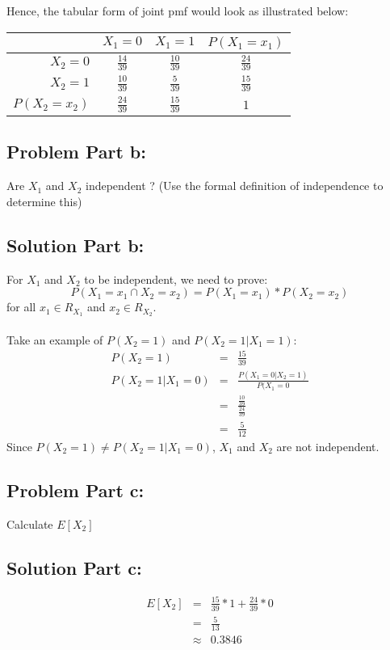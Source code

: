\documentclass[12pt]{article}%
\begin{document}
Hence, the tabular form of joint pmf would look as illustrated below: \\
\renewcommand{\arraystretch}{2}
\begin{center}
\begin{tabular}[5pt]{| r | c | c | c |}
\hline
 & $X_1 = 0$ & $X_1 = 1$ & $P(X_1 = x_1)$ \\
\hline
$X_2 = 0$ & $\frac{14}{39}$ & $\frac{10}{39}$ & $\frac{24}{39}$\\
\hline 
$X_2 = 1$ & $\frac{10}{39}$ & $\frac{5}{39}$ & $\frac{15}{39}$\\
\hline
$P(X_2 = x_2)$ & $\frac{24}{39}$ & $\frac{15}{39}$ & $1$ \\
\hline 
\end{tabular}
\end{center}
\renewcommand{\arraystretch}{1}
\subsection*{Problem Part b:}
Are $X_1$ and $X_2$ independent ? (Use the formal definition of independence to determine this)
\subsection*{Solution Part b:}
For $X_1$ and $X_2$ to be independent, we need to prove: \begin{equation*}
P(X_1=x_1 \cap X_2=x_2) = P(X_1=x_1) * P(X_2=x_2)
\end{equation*}
for all $x_1 \in R_{X_1}$ and $x_2 \in R_{X_2}$. \\ \\
Take an example of $P(X_2=1)$ and $P(X_2=1 | X_1=1)$:
\begin{eqnarray*}
P(X_2=1) & = & \frac{15}{39} \\
P(X_2=1 | X_1=0) & = & \frac{P(X_1=0 | X_2=1)}{P(X_1=0} \\
				 & = & \frac{\frac{10}{39}}{\frac{24}{39}} \\
				 & = &\frac{5}{12} 
\end{eqnarray*}
Since $P(X_2=1)\neq P(X_2=1 | X_1=0)$, $X_1$ and $X_2$ are not independent. 
\subsection*{Problem Part c:}
Calculate $E[X_2]$
\subsection*{Solution Part c:}
\begin{eqnarray*}
E[X_2] & = & \frac{15}{39} * 1 + \frac{24}{39} * 0 \\
	   & = & \frac{5}{13} \\
	   & \approx & 0.3846
\end{eqnarray*}
\end{document}
